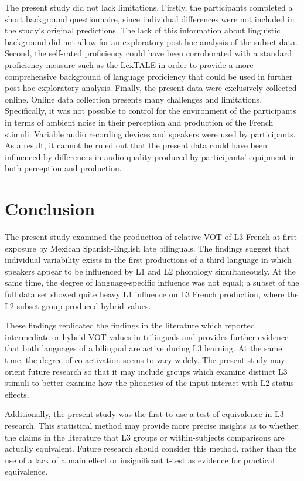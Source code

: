 \documentclass[
  english,
  man]{apa6}
\begin{document}
The present study did not lack limitations.
Firstly, the participants completed a short background questionnaire, since individual differences were not included in the study's original predictions.
The lack of this information about linguistic background did not allow for an exploratory post-hoc analysis of the subset data.
Second, the self-rated proficiency could have been corroborated with a standard proficiency measure such as the LexTALE in order to provide a more comprehensive background of language proficiency that could be used in further post-hoc exploratory analysis.
Finally, the present data were exclusively collected online. Online data collection presents many challenges and limitations.
Specifically, it was not possible to control for the environment of the participants in terms of ambient noise in their perception and production of the French stimuli.
Variable audio recording devices and speakers were used by participants.
As a result, it cannot be ruled out that the present data could have been influenced by differences in audio quality produced by participants' equipment in both perception and production.

\hypertarget{conclusion}{%
\section{Conclusion}\label{conclusion}}

The present study examined the production of relative VOT of L3 French at first exposure by Mexican Spanish-English late bilinguals.
The findings suggest that individual variability exists in the first productions of a third language in which speakers appear to be influenced by L1 and L2 phonology simultaneously.
At the same time, the degree of language-specific influence was not equal; a subset of the full data set showed quite heavy L1 influence on L3 French production, where the L2 subset group produced hybrid values.

These findings replicated the findings in the literature which reported intermediate or hybrid VOT values in trilinguals and provides further evidence that both languages of a bilingual are active during L3 learning.
At the same time, the degree of co-activation seems to vary widely. The present study may orient future research so that it may include groups which examine distinct L3 stimuli to better examine how the phonetics of the input interact with L2 status effects.

Additionally, the present study was the first to use a test of equivalence in L3 research.
This statistical method may provide more precise insights as to whether the claims in the literature that L3 groups or within-subjects comparisons are actually equivalent.
Future research should consider this method, rather than the use of a lack of a main effect or insignificant t-test as evidence for practical equivalence.
\end{document}
